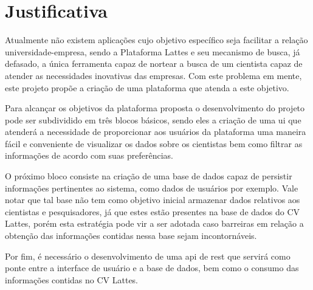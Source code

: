 \section{Justificativa}\label{sec:justificativa}

Atualmente não existem aplicações cujo objetivo específico seja facilitar a relação universidade-empresa, sendo a Plataforma Lattes e seu mecanismo de busca, já defasado, a única ferramenta capaz de nortear a busca de um cientista capaz de atender as necessidades inovativas das empresas. Com este problema em mente, este projeto propõe a criação de uma plataforma que atenda a este objetivo.

Para alcançar os objetivos da plataforma proposta o desenvolvimento do projeto pode ser subdividido em três blocos básicos, sendo eles a criação de uma \gls{ui} que atenderá a necessidade de proporcionar aos usuários da plataforma uma maneira fácil e conveniente de visualizar os dados sobre os cientistas bem como filtrar as informações de acordo com suas preferências.

O próximo bloco consiste na criação de uma base de dados capaz de persistir informações pertinentes ao sistema, como dados de usuários por exemplo. Vale notar que tal base não tem como objetivo inicial armazenar dados relativos aos cientistas e pesquisadores, já que estes estão presentes na base de dados do CV Lattes, porém esta estratégia pode vir a ser adotada caso barreiras em relação a obtenção das informações contidas nessa base sejam incontornáveis. 

Por fim, é necessário o desenvolvimento de uma \gls{api} de \gls{rest} que servirá como ponte entre a interface de usuário e a base de dados, bem como o consumo das informações contidas no CV Lattes.



